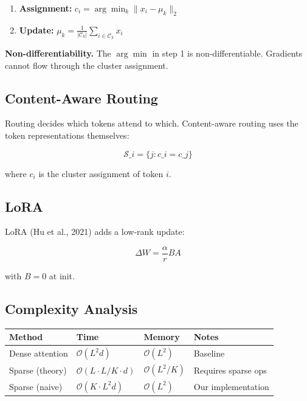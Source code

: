\begin{enumerate}
\item \textbf{Assignment:} $c_i = \arg\min_k \|x_i - \mu_k\|_2$
\item \textbf{Update:} $\mu_k = \frac{1}{|\mathcal{C}_k|} \sum_{i \in \mathcal{C}_k} x_i$

\end{enumerate}
\textbf{Non-differentiability.} The $\arg\min$ in step 1 is non-differentiable. 
Gradients cannot flow through the cluster assignment.

\subsection{Content-Aware Routing}

Routing decides which tokens attend to which. Content-aware routing uses 
the token representations themselves:

\[
\mathcal{S}\_i = \{j : c\_i = c\_j\}
\tag{3.5}
\]

where $c_i$ is the cluster assignment of token $i$.

\subsection{LoRA}

LoRA (Hu et al., 2021) adds a low-rank update:

\[
\Delta W = \frac{\alpha}{r} B A
\tag{3.6}
\]

with $B = 0$ at init.

\subsection{Complexity Analysis}

\begin{table}[H]
\centering
\small
\begin{tabular}{llll}
\toprule
\textbf{Method} & \textbf{Time} & \textbf{Memory} & \textbf{Notes} \\
\midrule
Dense attention & $\mathcal{O}(L^2 d)$ & $\mathcal{O}(L^2)$ & Baseline \\
Sparse (theory) & $\mathcal{O}(L \cdot L/K \cdot d)$ & $\mathcal{O}(L^2/K)$ & Requires sparse ops \\
Sparse (naive) & $\mathcal{O}(K \cdot L^2 d)$ & $\mathcal{O}(L^2)$ & Our implementation \\
\bottomrule
\end{tabular}
\end{table}

